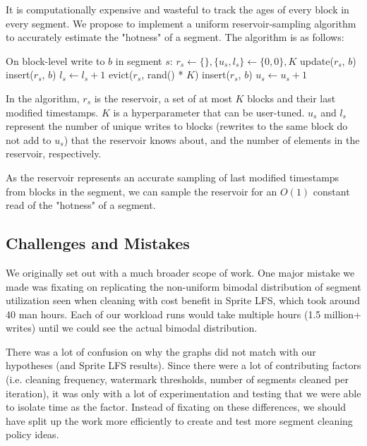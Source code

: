 \documentclass[12pt]{article}
\begin{document}
It is computationally expensive and wasteful to track the ages of every block in every segment. We propose to implement a uniform reservoir-sampling algorithm to accurately estimate the "hotness" of a segment. The algorithm is as follows: 

\begin{algorithm}[H]
\caption{NILFS2 Reservoir Write Modification}\label{alg:cap}
\begin{algorithmic}[1]
\State On block-level write to $b$ in segment $s$: 
\State $r_s \gets \{\}, \{u_s, l_s\} \gets \{0, 0\}, K$
\State update($r_s$, $b$)
\Else
        \State insert($r_s$, $b$)
        \State $l_s \gets l_s + 1$
    \Else
            \State evict($r_s$, rand() * $K$)
            \State insert($r_s$, $b$)
            \State $u_s \gets u_s+1$
        \EndIf
    \EndIf
\EndIf
\end{algorithmic}
\end{algorithm}

In the algorithm, $r_s$ is the reservoir, a set of at most $K$ blocks and their last modified timestamps. $K$ is a hyperparameter that can be user-tuned. $u_s$ and $l_s$ represent the number of unique writes to blocks (rewrites to the same block do not add to $u_s$) that the reservoir knows about, and the number of elements in the reservoir, respectively. 

As the reservoir represents an accurate sampling of last modified timestamps from blocks in the segment, we can sample the reservoir for an $O(1)$ constant read of the "hotness" of a segment. 


\subsection{Challenges and Mistakes}
We originally set out with a much broader scope of work. One major mistake we made was fixating on replicating the non-uniform bimodal distribution of segment utilization seen when cleaning with cost benefit in Sprite LFS, which took around 40 man hours. Each of our workload runs would take multiple hours (1.5 million+ writes) until we could see the actual bimodal distribution. 

There was a lot of confusion on why the graphs did not match with our hypotheses (and Sprite LFS results). Since there were a lot of contributing factors (i.e. cleaning frequency, watermark thresholds, number of segments cleaned per iteration), it was only with a lot of experimentation and testing that we were able to isolate time as the factor. Instead of fixating on these differences, we should have split up the work more efficiently to create and test more segment cleaning policy ideas. 
\end{document}
